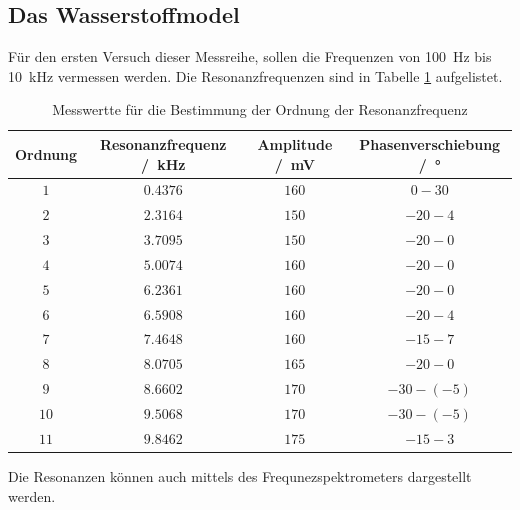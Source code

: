 \subsection{Das Wasserstoffmodel}
Für den ersten Versuch dieser Messreihe, sollen die Frequenzen von \SI{100}{\hertz} bis \SI{10}{\kilo\hertz} vermessen werden.
Die Resonanzfrequenzen sind in Tabelle \ref{tab:Resonanzfrequenzen} aufgelistet.
\FloatBarrier
\begin{table}
    \centering
    \caption{Messwertte für die Bestimmung der Ordnung der Resonanzfrequenz}
    \label{tab:Resonanzfrequenzen}
    \begin{tabular}{c c c c}
        \toprule
        Ordnung&Resonanzfrequenz /\SI{}{\kilo\hertz} &Amplitude /\SI{}{\milli\volt}& Phasenverschiebung /\SI{}{\degree}\\
        \midrule
        $\num{1}$&$\num{0.4376}$&$\num{160}$&$\num{0}-  \num{30}$\\
        $\num{2}$&$\num{2.3164}$&$\num{150}$&$\num{-20}-\num{4}$\\
        $\num{3}$&$\num{3.7095}$&$\num{150}$&$\num{-20}-\num{0}$\\
        $\num{4}$&$\num{5.0074}$&$\num{160}$&$\num{-20}-\num{0}$\\
        $\num{5}$&$\num{6.2361}$&$\num{160}$&$\num{-20}-\num{0}$\\
        $\num{6}$&$\num{6.5908}$&$\num{160}$&$\num{-20}-\num{4}$\\
        $\num{7}$&$\num{7.4648}$&$\num{160}$&$\num{-15}-\num{7}$\\
        $\num{8}$&$\num{8.0705}$&$\num{165}$&$\num{-20}-\num{0}$\\
        $\num{9}$&$\num{8.6602}$&$\num{170}$&$\num{-30}-(\num{-5})$\\
        $\num{10}$&$\num{9.5068}$&$\num{170}$&$\num{-30}-(\num{-5})$\\
        $\num{11}$&$\num{9.8462}$&$\num{175}$&$\num{-15}-\num{3}$\\
        \bottomrule
    \end{tabular}
\end{table}
\FloatBarrier
Die Resonanzen können auch mittels des Frequnezspektrometers dargestellt werden.
\FloatBarrier
